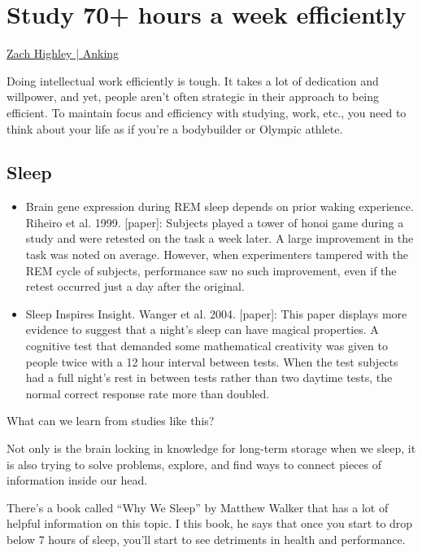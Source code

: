 \section{Study 70+ hours a week efficiently}

\href{https://youtu.be/FARXrLsBNJY}{Zach Highley | Anking}

Doing intellectual work efficiently is tough. It takes a lot of dedication and willpower, and yet, people aren't often strategic in their approach to being efficient. To maintain focus and efficiency with studying, work, etc., you need to think about your life as if you're a bodybuilder or Olympic athlete. 

\subsection{Sleep}

\begin{itemize}
	\item Brain gene expression during REM sleep depends on prior waking experience. Riheiro et al. 1999. [paper]: Subjects played a tower of honoi game during a study and were retested on the task a week later. A large improvement in the task was noted on average. However, when experimenters tampered with the REM cycle of subjects, performance saw no such improvement, even if the retest occurred just a day after the original. 
	\item Sleep Inspires Insight. Wanger et al. 2004. [paper]: This paper displays more evidence to suggest that a night's sleep can have magical properties. A cognitive test that demanded some mathematical creativity was given to people twice with a 12 hour interval between tests. When the test subjects had a full night's rest in between tests rather than two daytime tests, the normal correct response rate more than doubled.   
\end{itemize}

\begin{quest}
	\item What can we learn from studies like this?
	\begin{ans}
		Not only is the brain locking in knowledge for long-term storage when we sleep, it is also trying to solve problems, explore, and find ways to connect pieces of information inside our head.   
	\end{ans}
\end{quest}

There's a book called ``Why We Sleep'' by Matthew Walker that has a lot of helpful information on this topic. I this book, he says that once you start to drop below 7 hours of sleep, you'll start to see detriments in health and performance. 

